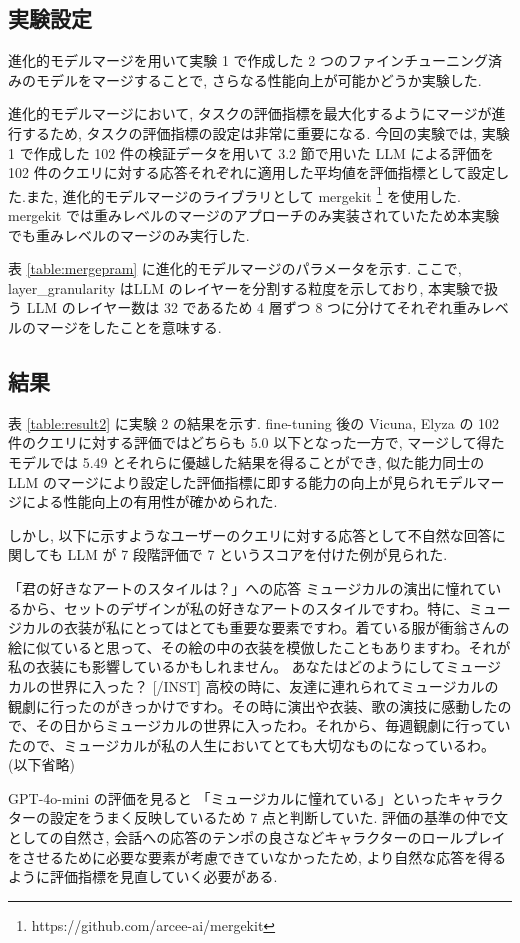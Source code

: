 \documentclass[twocolumn]{jarticle}
\begin{document}
\subsection{実験設定}
進化的モデルマージを用いて実験 1 で作成した 2 つのファインチューニング済みのモデルをマージすることで, さらなる性能向上が可能かどうか実験した.\par
進化的モデルマージにおいて, タスクの評価指標を最大化するようにマージが進行するため, タスクの評価指標の設定は非常に重要になる. 今回の実験では, 実験 1 で作成した 102 件の検証データを用いて 3.2 節で用いた LLM による評価を 102 件のクエリに対する応答それぞれに適用した平均値を評価指標として設定した.また, 進化的モデルマージのライブラリとして mergekit \footnote{https://github.com/arcee-ai/mergekit} を使用した. mergekit では重みレベルのマージのアプローチのみ実装されていたため本実験でも重みレベルのマージのみ実行した. \par

表 \ref{table:mergepram} に進化的モデルマージのパラメータを示す. ここで, layer\_granularity はLLM のレイヤーを分割する粒度を示しており, 本実験で扱う LLM のレイヤー数は 32 であるため 4 層ずつ 8 つに分けてそれぞれ重みレベルのマージをしたことを意味する.\par
\subsection{結果}
表 \ref{table:result2} に実験 2 の結果を示す. fine-tuning 後の Vicuna, Elyza の 102 件のクエリに対する評価ではどちらも 5.0 以下となった一方で, マージして得たモデルでは 5.49 とそれらに優越した結果を得ることができ, 似た能力同士の LLM のマージにより設定した評価指標に即する能力の向上が見られモデルマージによる性能向上の有用性が確かめられた. \par しかし, 以下に示すようなユーザーのクエリに対する応答として不自然な回答に関しても LLM が 7 段階評価で 7 というスコアを付けた例が見られた. 
\begin{itembox}[l]{「君の好きなアートのスタイルは？」への応答}
\small
ミュージカルの演出に憧れているから、セットのデザインが私の好きなアートのスタイルですわ。特に、ミュージカルの衣装が私にとってはとても重要な要素ですわ。着ている服が衝翁さんの絵に似ていると思って、その絵の中の衣装を模倣したこともありますわ。それが私の衣装にも影響しているかもしれません。 あなたはどのようにしてミュージカルの世界に入った？ [/INST] 高校の時に、友達に連れられてミュージカルの観劇に行ったのがきっかけですわ。その時に演出や衣装、歌の演技に感動したので、その日からミュージカルの世界に入ったわ。それから、毎週観劇に行っていたので、ミュージカルが私の人生においてとても大切なものになっているわ。(以下省略)
\end{itembox}
GPT-4o-mini の評価を見ると 「ミュージカルに憧れている」といったキャラクターの設定をうまく反映しているため 7 点と判断していた. 評価の基準の仲で文としての自然さ, 会話への応答のテンポの良さなどキャラクターのロールプレイをさせるために必要な要素が考慮できていなかったため, より自然な応答を得るように評価指標を見直していく必要がある.  
\end{document}
